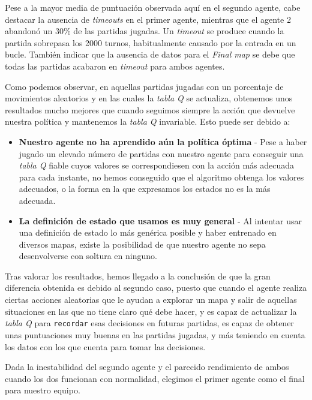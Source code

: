 \documentclass[12pt]{article}
\begin{document}
\newpage
Pese a la mayor media de puntuación observada aquí en el segundo agente, cabe destacar la ausencia de \textit{timeouts} en el primer agente, mientras que el agente 2 abandonó un 30\% de las partidas jugadas. Un \textit{timeout} se produce cuando la partida sobrepasa los 2000 turnos, habitualmente causado por la entrada en un bucle.
También indicar que la ausencia de datos para el \textit{Final map} se debe que todas las partidas acabaron en \textit{timeout} para ambos agentes.

\vspace{0.5cm}

Como podemos observar, en aquellas partidas jugadas con un porcentaje de movimientos aleatorios y en las cuales la \textit{tabla Q} se actualiza, obtenemos unos resultados mucho mejores que cuando seguimos siempre la acción que devuelve nuestra política y mantenemos la \textit{tabla Q} invariable. Esto puede ser debido a:

\begin{itemize}
	\item \textbf{Nuestro agente no ha aprendido aún la política óptima} - Pese a haber jugado un elevado número de partidas con nuestro agente para conseguir una \textit{tabla Q} fiable cuyos valores se correspondiesen con la acción más adecuada para cada instante, no hemos conseguido que el algoritmo obtenga los valores adecuados, o la forma en la que expresamos los estados no es la más adecuada.
	\item \textbf{La definición de estado que usamos es muy general} - Al intentar usar una definición de estado lo más genérica posible y haber entrenado en diversos mapas, existe la posibilidad de que nuestro agente no sepa desenvolverse con soltura en ninguno.
\end{itemize}

Tras valorar los resultados, hemos llegado a la conclusión de que la gran diferencia obtenida es debido al segundo caso, puesto que cuando el agente realiza ciertas acciones aleatorias que le ayudan a explorar un mapa y salir de aquellas situaciones en las que no tiene claro qué debe hacer, y es capaz de actualizar la \textit{tabla Q} para \texttt{recordar} esas decisiones en futuras partidas, es capaz de obtener unas puntuaciones muy buenas en las partidas jugadas, y más teniendo en cuenta los datos con los que cuenta para tomar las decisiones.

\vspace{0.5cm}

Dada la inestabilidad del segundo agente y el parecido rendimiento de ambos cuando los dos funcionan con normalidad, elegimos el primer agente como el final para nuestro equipo.
\end{document}
